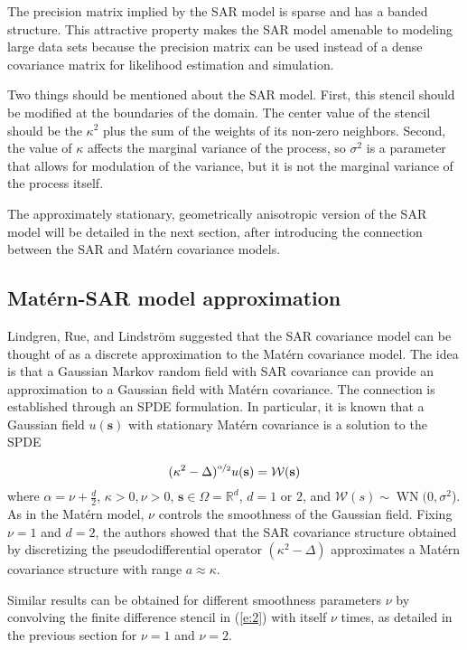 \documentclass[review]{elsarticle}
\begin{document}
The precision matrix implied by the SAR model is sparse and has a banded structure. This attractive property makes the SAR model amenable to modeling large data sets because the precision matrix can be used instead of a dense covariance matrix for likelihood estimation and simulation. 

Two things should be mentioned about the SAR model. First, this stencil should be modified at the boundaries of the domain. The center value of the stencil should be the $\kappa^2$ plus the sum of the weights of its non-zero neighbors. Second, the value of $\kappa$ affects the marginal variance of the process, so $\sigma^2$ is a parameter that allows for modulation of the variance, but it is not the marginal variance of the process itself.

The approximately stationary, geometrically anisotropic version of the SAR model will be detailed in the next section, after introducing the connection between the SAR and Mat\'ern covariance models.



\subsection{Mat\'ern-SAR model approximation}

Lindgren, Rue, and Lindstr{\"o}m \cite{lindgren2011explicit} suggested that the SAR covariance model can be thought of as a discrete approximation to the Mat\'ern covariance model. The idea is that a Gaussian Markov random field with SAR covariance can provide an approximation to a Gaussian field with Mat\'ern covariance. The connection is established through an SPDE formulation. In particular, it is known that a Gaussian field $u(\mathbf s)$ with stationary Mat\'ern covariance is a solution to the SPDE

$$ (\kappa^2 - \Delta)^{\nicefrac{\alpha}{2}} u(\mathbf s) = \mathcal{W}(\mathbf s) $$
where $\alpha = \nu + \frac{d}{2}$, $\kappa > 0, \nu > 0$, $\mathbf s \in \Omega = \mathbb{R}^d$, $d = 1$ or $2$, and $\mathcal{W}(s) \sim \operatorname{WN}(0, \sigma^2$). As in the Mat\'ern model, $\nu$ controls the smoothness of the Gaussian field. Fixing $\nu = 1$ and $d = 2$, the authors showed that the SAR covariance structure obtained by discretizing the pseudodifferential operator $(\kappa^2 - \Delta)$ approximates a Mat\'ern covariance structure with range $a \approx \kappa$. 

Similar results can be obtained for different smoothness parameters $\nu$ by convolving the finite difference stencil in (\ref{e:2}) with itself $\nu$ times, as detailed in the previous section for $\nu=1$ and $\nu=2$.
\end{document}

